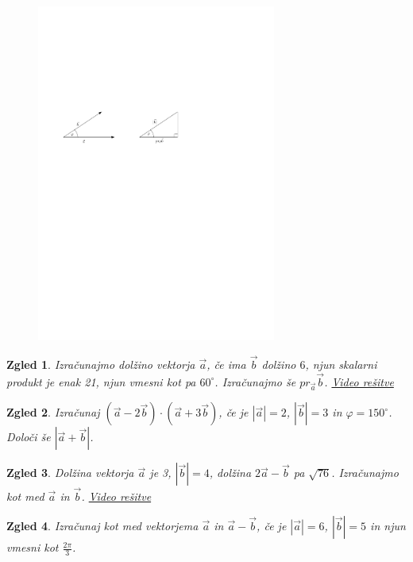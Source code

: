 \documentclass{article}
\newtheorem*{zgled}{Zgled}
\begin{document}
\begin{figure}[H]
\includegraphics[width=0.7\textwidth]{skalarni.produkt.pdf}
\centering
\end{figure}

\begin{zgled}
    Izračunajmo dolžino vektorja $\vec{a}$, če ima $\vec{b}$ dolžino $6$, njun skalarni produkt je enak 21, njun vmesni kot pa $60^\circ$. Izračunajmo še $pr_{\vec{a}}\vec{b}$.
    \href{https://youtu.be/PCUppodHkyY}{Video rešitve}
\end{zgled}

\begin{zgled}
    Izračunaj $(\vec{a}-2\vec{b})\cdot (\vec{a}+3\vec{b})$, če je $|\vec{a}|=2$, $|\vec{b}|=3$ in $\varphi=150^\circ$. Določi še $|\vec{a}+\vec{b}|$.
\end{zgled}

\begin{zgled}
    Dolžina vektorja $\vec{a}$ je 3, $|\vec{b}|=4$, dolžina $2\vec{a}-\vec{b}$ pa $\sqrt{76}$. Izračunajmo kot med $\vec{a}$ in $\vec{b}$.
    \href{https://youtu.be/xMxlB981-ek}{Video rešitve}
\end{zgled}

\begin{zgled}
    Izračunaj kot med vektorjema $\vec{a}$ in $\vec{a}-\vec{b}$, če je $|\vec{a}|=6$, $|\vec{b}|=5$ in njun vmesni kot $\frac{2\pi}{3}$.
\end{zgled}
\end{document}
